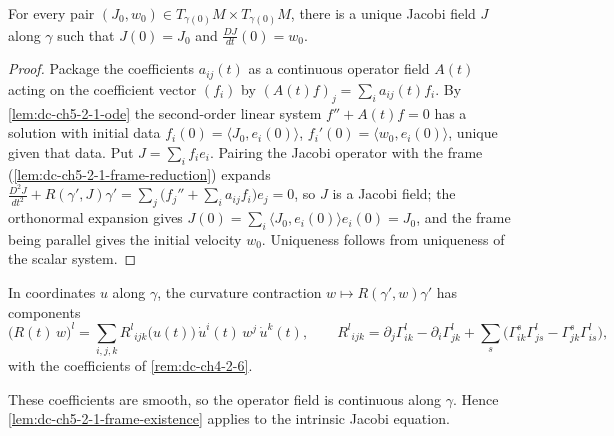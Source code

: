 \begin{lemma}
  \label{lem:dc-ch5-2-1-frame-existence}
  \leanok
  For every pair $(J_0,w_0)\in T_{\gamma(0)}M\times T_{\gamma(0)}M$, there is a
  unique Jacobi field $J$ along $\gamma$ such that
  $J(0)=J_0$ and $\frac{DJ}{dt}(0)=w_0$.
\end{lemma}
\begin{proof}
  \leanok
  \sketch
  Package the coefficients $a_{ij}(t)$ as a continuous operator field $A(t)$ acting on the
  coefficient vector $(f_i)$ by $(A(t)f)_j=\sum_i a_{ij}(t)f_i$. By \cref{lem:dc-ch5-2-1-ode}
  the second-order linear system $f''+A(t)f=0$ has a solution with initial data
  $f_i(0)=\langle J_0,e_i(0)\rangle$, $f_i'(0)=\langle w_0,e_i(0)\rangle$, unique given that
  data. Put $J=\sum_i f_i e_i$. Pairing the Jacobi operator with the frame
  (\cref{lem:dc-ch5-2-1-frame-reduction}) expands
  $\frac{D^2J}{dt^2}+R(\gamma',J)\gamma'=\sum_j\big(f_j''+\sum_i a_{ij}f_i\big)e_j=0$, so $J$
  is a Jacobi field; the orthonormal expansion gives
  $J(0)=\sum_i\langle J_0,e_i(0)\rangle e_i(0)=J_0$, and the frame being parallel gives the
  initial velocity $w_0$. Uniqueness follows from uniqueness of the scalar system.
\end{proof}

\begin{lemma}
  \label{lem:dc-ch5-2-1-real-curvature}
  \leanok
  In coordinates $u$ along $\gamma$, the curvature contraction
  $w\mapsto R(\gamma',w)\gamma'$ has components
  $$
  \big(R(t)\,w\big)^l=\sum_{i,j,k}R^l{}_{ijk}\big(u(t)\big)\,\dot u^i(t)\,w^j\,\dot u^k(t),
  \qquad
  R^l{}_{ijk}=\partial_j\Gamma^l_{ik}-\partial_i\Gamma^l_{jk}
    +\sum_s\big(\Gamma^s_{ik}\Gamma^l_{js}-\Gamma^s_{jk}\Gamma^l_{is}\big),
  $$
  with the coefficients of \cref{rem:dc-ch4-2-6}.

  \sketch
  These coefficients are smooth, so the operator field is continuous along $\gamma$. Hence
  \cref{lem:dc-ch5-2-1-frame-existence} applies to the intrinsic Jacobi equation.
\end{lemma}

